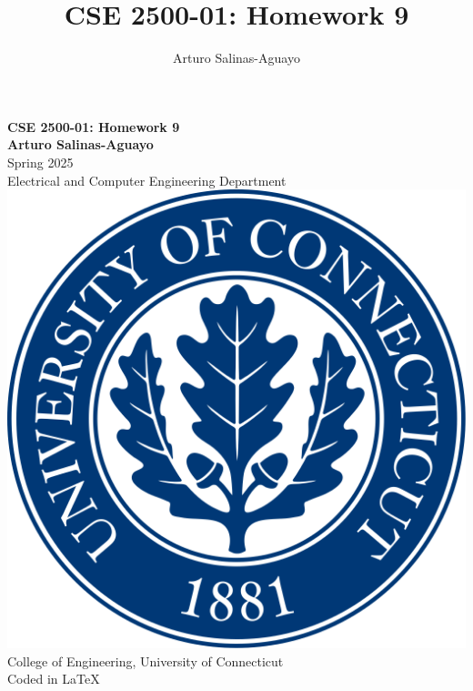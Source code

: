 \documentclass[12pt]{article}
\author{Arturo Salinas-Aguayo}
\title{CSE 2500-01: Homework 9}
\begin{document}
\newcommand{\closure}[2][3]{%
	{}\mkern#1mu\overline{\mkern-#1mu#2}}
\newcommand\ncoverline[1]{\mkern1mu\overline{\mkern-1mu#1\mkern-1mu}\mkern1mu}
\begin{titlepage}
	\centering
	\vspace*{3cm}
	\huge\textbf{CSE 2500-01: Homework 9}\\
	\vspace{5cm}
	\Large\textbf{Arturo Salinas-Aguayo}\\
	\normalsize
	Spring 2025\\
	Electrical and Computer Engineering Department\\
	\vfill
	\includegraphics[scale=0.1]{uconnlogo}\\
	College of Engineering, University of Connecticut\\
	\scriptsize{Coded in \LaTeX}
	\vspace*{1cm}
\end{titlepage}
\end{document}
